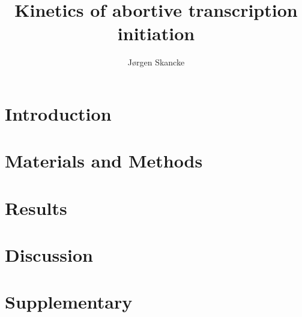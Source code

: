 \documentclass[12pt]{article}
\author{J\o rgen Skancke}
\title{Kinetics of abortive transcription initiation}
\begin{document}
\begin{abstract}

\end{abstract}

\section{Introduction}


\section{Materials and Methods}


\section{Results}


\section{Discussion}

\section{Supplementary}



\end{document}
